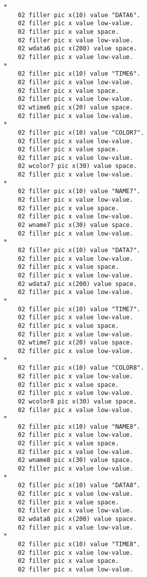 {{{\begin{verbatim}
      *    
          02 filler pic x(10) value "DATA6".
          02 filler pic x value low-value.
          02 filler pic x value space.
          02 filler pic x value low-value.
          02 wdata6 pic x(200) value space.
          02 filler pic x value low-value.
      *    
          02 filler pic x(10) value "TIME6".
          02 filler pic x value low-value.
          02 filler pic x value space.
          02 filler pic x value low-value.
          02 wtime6 pic x(20) value space.
          02 filler pic x value low-value.
      *    
          02 filler pic x(10) value "COLOR7".
          02 filler pic x value low-value.
          02 filler pic x value space.
          02 filler pic x value low-value.
          02 wcolor7 pic x(30) value space.
          02 filler pic x value low-value.
      *    
          02 filler pic x(10) value "NAME7".
          02 filler pic x value low-value.
          02 filler pic x value space.
          02 filler pic x value low-value.
          02 wname7 pic x(30) value space.
          02 filler pic x value low-value.
      *    
          02 filler pic x(10) value "DATA7".
          02 filler pic x value low-value.
          02 filler pic x value space.
          02 filler pic x value low-value.
          02 wdata7 pic x(200) value space.
          02 filler pic x value low-value.
      *    
          02 filler pic x(10) value "TIME7".
          02 filler pic x value low-value.
          02 filler pic x value space.
          02 filler pic x value low-value.
          02 wtime7 pic x(20) value space.
          02 filler pic x value low-value.
      *    
          02 filler pic x(10) value "COLOR8".
          02 filler pic x value low-value.
          02 filler pic x value space.
          02 filler pic x value low-value.
          02 wcolor8 pic x(30) value space.
          02 filler pic x value low-value.
      *    
          02 filler pic x(10) value "NAME8".
          02 filler pic x value low-value.
          02 filler pic x value space.
          02 filler pic x value low-value.
          02 wname8 pic x(30) value space.
          02 filler pic x value low-value.
      *    
          02 filler pic x(10) value "DATA8".
          02 filler pic x value low-value.
          02 filler pic x value space.
          02 filler pic x value low-value.
          02 wdata8 pic x(200) value space.
          02 filler pic x value low-value.
      *    
          02 filler pic x(10) value "TIME8".
          02 filler pic x value low-value.
          02 filler pic x value space.
          02 filler pic x value low-value.

\end{verbatim}}}}
